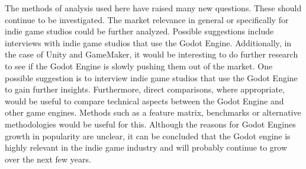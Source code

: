 The methods of analysis used here have raised many new questions.
These should continue to be investigated.
The market relevance in general or specifically for indie game studios could be further analyzed.
Possible suggestions include interviews with indie game studios that use the Godot Engine.
Additionally, in the case of Unity and GameMaker, it would be interesting to do further research to see if the Godot Engine is slowly pushing them out of the market.
One possible suggestion is to interview indie game studios that use the Godot Engine to gain further insights.
Furthermore, direct comparisons, where appropriate, would be useful to compare technical aspects between the Godot Engine and other game engines.
Methods such as a feature matrix, benchmarks or alternative methodologies would be useful for this. 
Although the reasons for Godot Engines growth in popularity are unclear, it can be concluded that the Godot engine is highly relevant in the indie game industry and will probably continue to grow over the next few years. 
